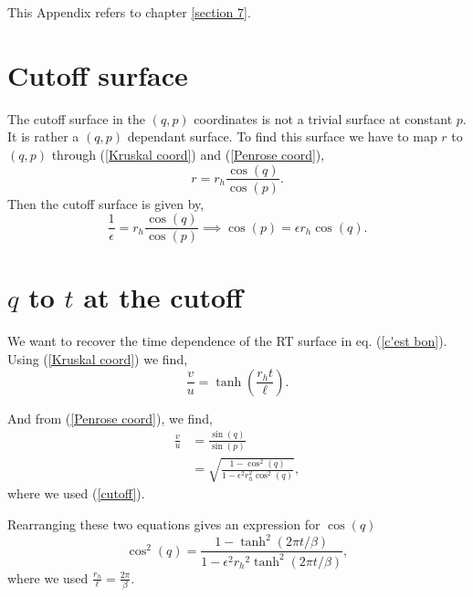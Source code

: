 This Appendix refers to chapter \ref{section 7}.

\section{Cutoff surface}

The cutoff surface in the $(q,p)$ coordinates is not a trivial surface at constant $p$. It is rather a $(q,p)$ dependant surface. To find this surface we have to map $r$ to $(q,p)$ through (\ref{Kruskal coord}) and (\ref{Penrose coord}),
\begin{equation}
    r = r_h\frac{\cos(q)}{\cos(p)}.
\end{equation}
Then the cutoff surface is given by,
\begin{equation}\label{cutoff}
    \frac{1}{\epsilon} = r_h\frac{\cos(q)}{\cos(p)}\implies \cos(p)=\epsilon r_h \cos(q).
\end{equation}

\section{$q$ to $t$ at the cutoff}

We want to recover the time dependence of the RT surface in eq. (\ref{c'est bon}). Using (\ref{Kruskal coord}) we find,
\begin{equation}
    \frac{v}{u} = \tanh\left(\frac{r_h t}{\ell}\right).
\end{equation}

And from (\ref{Penrose coord}), we find,
\begin{align}
    \frac{v}{u} &= \frac{\sin(q)}{\sin(p)}\\
    &= \sqrt{\frac{1-\cos^2(q)}{1-\epsilon^2r_h^2\cos^2(q)}},
\end{align}
where we used (\ref{cutoff}).

Rearranging these two equations gives an expression for $\cos(q)$
\begin{equation}
    \cos^2(q)=\frac{1-\tanh^2(2\pi t/\beta)}{1-\epsilon^2{r_h}^2\tanh^2(2\pi t/\beta)},
\end{equation}
where we used $\frac{r_h}{\ell}=\frac{2\pi}{\beta}$.
